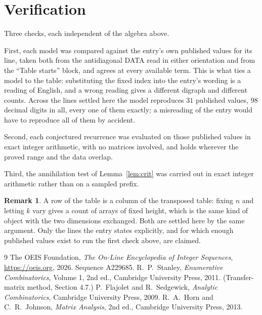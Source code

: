 \documentclass[11pt,a4paper]{article}
\theoremstyle{plain}
\theoremstyle{definition}
\newtheorem{remark}[theorem]{Remark}
\begin{document}
\section{Verification}

Three checks, each independent of the algebra above.

First, each model was compared against the entry's own published values for its line, taken
both from the antidiagonal DATA read in either orientation and from the ``Table starts''
block, and agrees at every available term. This is what ties a model to the table:
substituting the fixed index into the entry's wording is a reading of English, and a wrong
reading gives a different digraph and different counts. Across the lines settled here the
model reproduces $31$ published values, $98$ decimal digits in all, every one of
them exactly; a misreading of the entry would have to reproduce all of them by accident.

Second, each conjectured recurrence was evaluated on those published values in exact
integer arithmetic, with no matrices involved, and holds wherever the proved range and the
data overlap.

Third, the annihilation test of Lemma~\ref{lem:crit} was carried out in exact integer
arithmetic rather than on a sampled prefix.

\begin{remark}
A row of the table is a column of the transposed table: fixing $n$ and letting $k$ vary gives a
count of arrays of fixed height, which is the same kind of object with the two dimensions
exchanged. Both are settled here by the same argument. Only the lines the entry states
explicitly, and for which enough published values exist to run the first check above, are
claimed.
\end{remark}

\begin{thebibliography}{9}
 The OEIS Foundation, \emph{The On-Line Encyclopedia of Integer
Sequences}, \url{https://oeis.org}, 2026. Sequence A229685.
 R.~P.~Stanley, \emph{Enumerative Combinatorics}, Volume 1, 2nd ed.,
Cambridge University Press, 2011. (Transfer-matrix method, Section 4.7.)
 P.~Flajolet and R.~Sedgewick, \emph{Analytic Combinatorics}, Cambridge
University Press, 2009.
 R.~A.~Horn and C.~R.~Johnson, \emph{Matrix Analysis}, 2nd ed., Cambridge
University Press, 2013.
\end{thebibliography}
\end{document}
